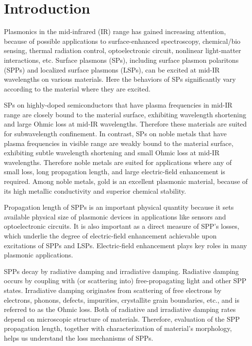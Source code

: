 \documentclass[aip,apl,reprint]{revtex4-1}
\begin{document}
\maketitle
 
\section{Introduction}
Plasmonics in the mid-infrared (IR) range has gained increasing attention,\cite{Stanley, Law} because of possible applications to surface-enhanced spectroscopy,\cite{Neubrech, Hoang} chemical/bio sensing,\cite{Cleary2008} thermal radiation control,\cite{Kusunoki} optoelectronic circuit,\cite{Ebbesen, Soref} nonlinear light-matter interactions,\cite{Kusa2015} etc. Surface plasmons (SPs), including surface plasmon polaritons (SPPs) and localized surface plasmons (LSPs), can be excited at mid-IR wavelengths on various materials.\cite{Law} Here the behaviors of SPs significantly vary according to the material where they are excited.\cite{Law} 

SPs on highly-doped semiconductors that have plasma frequencies in mid-IR range are closely bound to the material surface, exhibiting wavelength shortening and large Ohmic loss at mid-IR wavelengths. Therefore these materials are suited for subwavelength confinement. In contrast, SPs on noble metals that have plasma frequencies in visible range are weakly bound to the material surface, exhibiting subtle wavelength shortening and small Ohmic loss at mid-IR wavelengths. Therefore noble metals are suited for applications where any of small loss, long propagation length, and large electric-field enhancement is required.\cite{Law, Kusa2014}
Among noble metals, gold is an excellent plasmonic material, because of its high metallic conductivity and superior chemical stability.\cite{Zayats}

Propagation length of SPPs is an important physical quantity because it sets available physical size of plasmonic devices in applications like sensors and optoelectronic circuits. It is also important as a direct measure of SPP's losses, which underlie the degree of electric-field enhancement achievable upon excitations of SPPs and LSPs. Electric-field enhancement plays key roles in many plasmonic applications.

SPPs decay by radiative damping and irradiative damping. Radiative damping occurs by coupling with (or scattering into) free-propagating light and other SPP states. Irradiative damping originates from scattering of free electrons by electrons, phonons, defects, impurities, crystallite grain boundaries, etc., and is referred to as the Ohmic loss. Both of radiative and irradiative damping rates depend on microscopic structure of materials. Therefore, evaluation of the SPP propagation length, together with characterization of material's morphology, helps us understand the loss mechanisms of SPPs.
\end{document}
